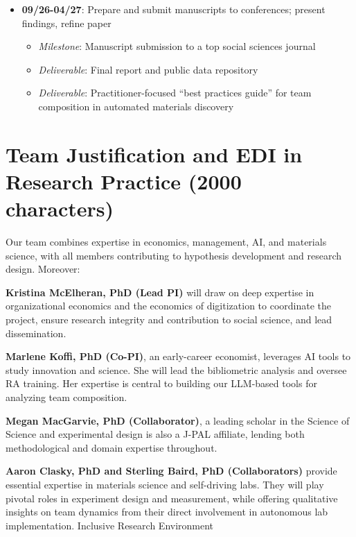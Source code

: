 \documentclass{article}
\begin{document}
\begin{description}
\begin{itemize}
\item \textbf{09/26-04/27}: Prepare and submit manuscripts to conferences; present findings, refine paper
  \begin{itemize}
  \item \textit{Milestone}: Manuscript submission to a top social sciences journal
  \item \textit{Deliverable}: Final report and public data repository
    \item \textit{Deliverable}: Practitioner-focused “best practices guide” for team composition in automated materials discovery
  \end{itemize}

\end{itemize}
\end{description}
\newpage
\section{Team Justification and EDI in Research Practice (2000 characters)}

Our team combines expertise in economics, management, AI, and materials science, with all members contributing to hypothesis development and research design. Moreover:


\textbf{Kristina McElheran, PhD (Lead PI)} will draw on deep expertise in organizational economics and the economics of digitization to coordinate the project, ensure research integrity and contribution to social science, and lead dissemination.

\textbf{Marlene Koffi, PhD (Co-PI)}, an early-career economist, leverages AI tools to study innovation and science. She will lead the bibliometric analysis and oversee RA training. Her expertise is central to building our LLM-based tools for analyzing team composition.

\textbf{Megan MacGarvie, PhD (Collaborator)}, a leading scholar in the Science of Science and experimental design is also a J-PAL affiliate, lending both methodological and domain expertise throughout.


\textbf{Aaron Clasky, PhD and Sterling Baird, PhD (Collaborators)} provide essential expertise in materials science and self-driving labs. They will play pivotal roles in experiment design and measurement, while offering qualitative insights on team dynamics from their direct involvement in autonomous lab implementation.
Inclusive Research Environment
\end{document}

